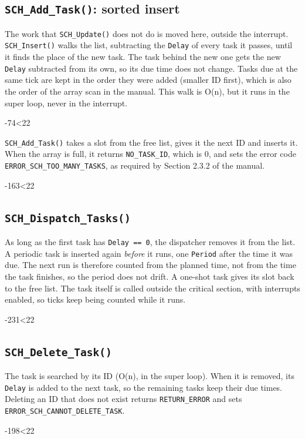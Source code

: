 \documentclass[12pt,a4paper]{article}
\numberwithin{figure}{section}
\numberwithin{table}{section}
\newcommand{\srcbody}[4]{}
\newcommand{\src}[4]{\par\ifnum\numexpr#3-#2\relax<22 \noindent\begin{minipage}{\linewidth}\srcbody{#1}{#2}{#3}{#4}\end{minipage}\else\srcbody{#1}{#2}{#3}{#4}\fi\par}
\newcommand{\code}[1]{\texttt{#1}}
\begin{document}
\subsection{\code{SCH\_Add\_Task()}: sorted insert}
\label{sec:add}
The work that \code{SCH\_Update()} does not do is moved here, outside the interrupt. \code{SCH\_Insert()} walks the list, subtracting the \code{Delay} of every task it passes, until it finds the place of the new task. The task behind the new one gets the new \code{Delay} subtracted from its own, so its due time does not change. Tasks due at the same tick are kept in the order they were added (smaller ID first), which is also the order of the array scan in the manual. This walk is O(n), but it runs in the super loop, never in the interrupt.
\src{scheduler.c}{74}{101}{Inserting a task into the sorted list}

\code{SCH\_Add\_Task()} takes a slot from the free list, gives it the next ID and inserts it. When the array is full, it returns \code{NO\_TASK\_ID}, which is 0, and sets the error code \code{ERROR\_SCH\_TOO\_MANY\_TASKS}, as required by Section 2.3.2 of the manual.
\src{scheduler.c}{163}{196}{\code{SCH\_Add\_Task()}}

\subsection{\code{SCH\_Dispatch\_Tasks()}}
As long as the first task has \code{Delay == 0}, the dispatcher removes it from the list. A periodic task is inserted again \emph{before} it runs, one \code{Period} after the time it was due. The next run is therefore counted from the planned time, not from the time the task finishes, so the period does not drift. A one-shot task gives its slot back to the free list. The task itself is called outside the critical section, with interrupts enabled, so ticks keep being counted while it runs.
\src{scheduler.c}{231}{263}{\code{SCH\_Dispatch\_Tasks()}}

\subsection{\code{SCH\_Delete\_Task()}}
\label{sec:delete}
The task is searched by its ID (O(n), in the super loop). When it is removed, its \code{Delay} is added to the next task, so the remaining tasks keep their due times. Deleting an ID that does not exist returns \code{RETURN\_ERROR} and sets \code{ERROR\_SCH\_CANNOT\_DELETE\_TASK}.
\src{scheduler.c}{198}{229}{\code{SCH\_Delete\_Task()}}
\end{document}
